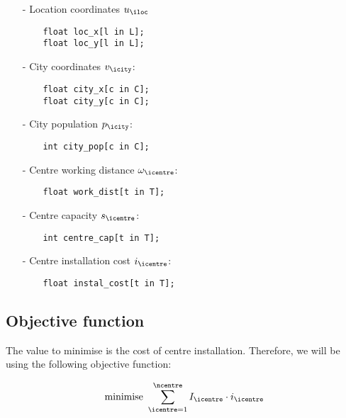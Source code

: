 \begin{itemize}
    \item[-] Location coordinates $u_\iloc$
    
    \begin{lstlisting}
    float loc_x[l in L];
    float loc_y[l in L];
    \end{lstlisting}
    
    \item[-] City coordinates $v_\icity$:
    
    \begin{lstlisting}
    float city_x[c in C];
    float city_y[c in C];
    \end{lstlisting}
    
    \item[-] City population $p_\icity$:
    
    \begin{lstlisting}
    int city_pop[c in C];
    \end{lstlisting}
    
    \item[-] Centre working distance $\omega_\icentre$:
    
    \begin{lstlisting}
    float work_dist[t in T];
    \end{lstlisting}
    
    \item[-] Centre capacity $s_\icentre$:
    
    \begin{lstlisting}
    int centre_cap[t in T];
    \end{lstlisting}
    
    \item[-] Centre installation cost $i_\icentre$:
    
    \begin{lstlisting}
    float instal_cost[t in T];
    \end{lstlisting}
    
\end{itemize}

\subsection{Objective function}

The value to minimise is the cost of centre installation. Therefore, we will be using the
following objective function:

\begin{equation}
\text{minimise  } \sum_{\icentre = 1}^{\ncentre} I_\icentre \cdot i_\icentre
\label{ILP:objective-function}
\end{equation}

